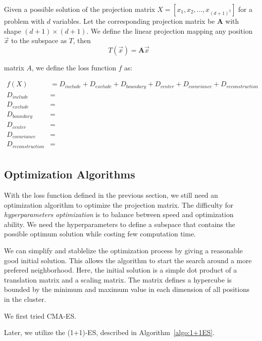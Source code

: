 Given a possible solution of the projection matrix $X = [x_1, x_2, ..., x_{(d+1)^2}]$ for a problem with $d$ variables.
Let the corresponding projection matrix be $\textbf{A}$ with shape $(d+1) \times (d+1)$.
We define the linear projection mapping any position $\vec{x}$ to the subspace as $T$, then
\begin{displaymath}
T(\vec{x}) = \textbf{A}\vec{x} 
\end{displaymath}


matrix $A$, we define the loss function $f$ as: 

\begin{align*}
f(X)                &= D_{include} + D_{exclude} + D_{boundary} + D_{center} + D_{covariance} + D_{reconstruction} \\ D_{include}         &= \\
D_{exclude}         &= \\ 
D_{boundary}        &= \\ 
D_{center}          &= \\ 
D_{covariance}      &= \\ 
D_{reconstruction}  &= \\ 
\end{align*}


\subsection{Optimization Algorithms}

With the loss function defined in the previous section, 
we still need an optimization algorithm to optimize the projection matrix.
The difficulty for \textit{hyperparameters optimization} is to balance between speed and optimization ability.
We need the hyperparameters to define a subspace that contains the possible optimum solution while costing few computation time.

We can simplify and stablelize the optimization process by giving a reasonable good initial solution.
This allows the algorithm to start the search around a more prefered neighborhood.
Here, the initial solution is a simple dot product of a translation matrix and a scaling matrix. 
The matrix defines a hypercube is bounded by the minimum and maximum value in each dimension of all positions in the cluster.


We first tried CMA-ES.

Later, we utilize the (1+1)-ES, described in Algorithm~\ref{algo:1+1ES}.



